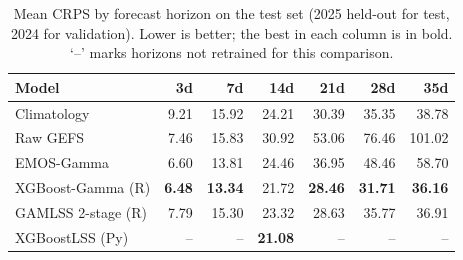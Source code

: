 \begin{table}[H]
\centering
\small
\begin{tabular}{lrrrrrr}
\toprule
Model & 3d & 7d & 14d & 21d & 28d & 35d \\
\midrule
Climatology & 9.21 & 15.92 & 24.21 & 30.39 & 35.35 & 38.78 \\
Raw GEFS & 7.46 & 15.83 & 30.92 & 53.06 & 76.46 & 101.02 \\
EMOS-Gamma & 6.60 & 13.81 & 24.46 & 36.95 & 48.46 & 58.70 \\
XGBoost-Gamma (R) & \textbf{6.48} & \textbf{13.34} & 21.72 & \textbf{28.46} & \textbf{31.71} & \textbf{36.16} \\
GAMLSS 2-stage (R) & 7.79 & 15.30 & 23.32 & 28.63 & 35.77 & 36.91 \\
XGBoostLSS (Py) & -- & -- & \textbf{21.08} & -- & -- & -- \\
\bottomrule
\end{tabular}
\caption{Mean CRPS by forecast horizon on the test set (2025 held-out for test, 2024 for validation). Lower is better; the best in each column is in bold. `--' marks horizons not retrained for this comparison.}
\label{tab:comparison-crps-test}
\end{table}
